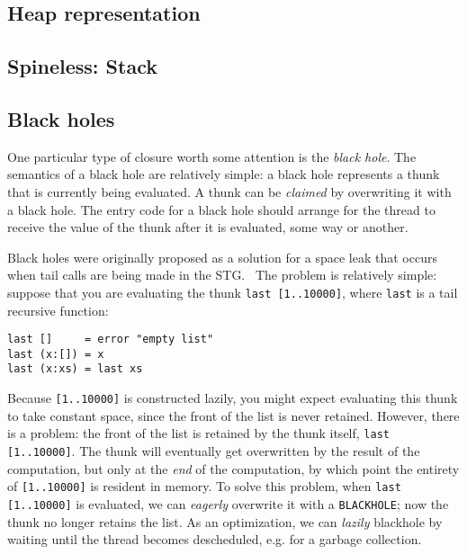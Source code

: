 \subsection{Heap representation}

\subsection{Spineless: Stack}





\subsection{Black holes} \label{sec:blackhole}

One particular type of closure worth some attention is the \emph{black
hole}.  The semantics of a black hole are relatively simple: a black
hole represents a thunk that is currently being evaluated.  A thunk
can be \emph{claimed} by overwriting it with a black hole. The entry
code for a black hole should arrange for the thread to receive the value
of the thunk after it is evaluated, some way or another.

Black holes were originally proposed as a solution for a space leak that
occurs when tail calls are being made in the STG.~\cite{Jones2008} The
problem is relatively simple: suppose that you are evaluating the thunk \verb|last [1..10000]|,
where \verb|last| is a tail recursive function:

\begin{verbatim}
last []     = error "empty list"
last (x:[]) = x
last (x:xs) = last xs
\end{verbatim}

Because \verb|[1..10000]| is constructed lazily, you might expect
evaluating this thunk to take constant space, since the front of the
list is never retained.  However, there is a problem: the front of the
list is retained by the thunk itself, \verb|last [1..10000]|.  The thunk
will eventually get overwritten by the result of the computation, but
only at the \emph{end} of the computation, by which point the entirety
of \verb|[1..10000]| is resident in memory.  To solve this problem, when
\verb|last [1..10000]| is evaluated, we can \emph{eagerly} overwrite it
with a \verb|BLACKHOLE|; now the thunk no longer retains the list.  As
an optimization, we can \emph{lazily} blackhole by waiting until the
thread becomes descheduled, e.g. for a garbage collection.

